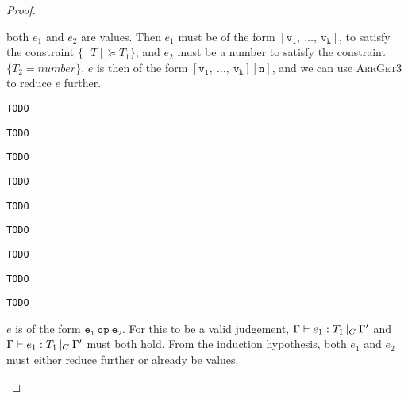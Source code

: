 \documentclass[a4paper]{article}
\theoremstyle{dotless}
\begin{document}
\begin{proof}
\begin{case}[ArrayType]
  	\begin{subcase}
	  both $e_1$ and $e_2$ are values. Then $e_1$ must be of the form 
	  $\mathtt{[v_1,\ \dots,\ v_k]}$, to satisfy the constraint $\{[T] \succeq T_1\}$,
	  and $e_2$ must be a number to satisfy the constraint $\{T_2=number\}$.
	  $e$ is then of the form $\mathtt{[v_1,\ \dots,\ v_k][n]}$, and we 
	  can use \textsc{ArrGet3} to reduce $e$ further.
  	\end{subcase}

  \end{case}

  \begin{case}[CallType]\label{calltype}
	\texttt{TODO}
  \end{case}

  \begin{case}[PropCallType]\label{propcalltype}
	\texttt{TODO}
  \end{case}

  \begin{case}[AssignType]\label{assigntype}
	\texttt{TODO}
  \end{case}

  \begin{case}[AssignTypeUndef]\label{assigntypeundef}
	\texttt{TODO}
  \end{case}

  \begin{case}[PropAssignType]\label{propassigntype}
	\texttt{TODO}
  \end{case}

  \begin{case}[ArrayAssignType]\label{arrayassigntype}
	\texttt{TODO}
  \end{case}

  \begin{case}[NumAssignType]\label{numassigntype}
	\texttt{TODO}
  \end{case}

  \begin{case}[PropNumAssignType]\label{propnumassigntype}
	\texttt{TODO}
  \end{case}

  \begin{case}[ArrayNumAssignType]\label{arraynumassigntype}
	\texttt{TODO}
  \end{case}

  \begin{case}\label{binoptype}
  	$e$ is of the form $\mathtt{e_1\ op\ e_2}$. For this to be a valid
  	judgement, $\Gamma{}\vdash e_1: T_1\,|_C\:\Gamma'$ and $\Gamma{}\vdash e_1: T_1\,|_C\:\Gamma'$ must both hold. From
  	the induction hypothesis, both $e_1$ and $e_2$ must either reduce further
  	or already be values.


\end{case}
\end{proof}
\end{document}
